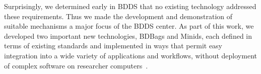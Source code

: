 \documentclass[11pt]{article}
\begin{document}

Surprisingly, we determined early in BDDS that no existing technology addressed these requirements.
Thus we made the development and demonstration of suitable mechanisms a major focus of the BDDS center.
As part of this work, we developed two important new technologies, BDBags and Minids, each
defined in terms of existing standards and
implemented in ways that permit easy integration into a wide variety of
applications and workflows, without deployment of complex software on researcher computers~\cite{chard16}.
\end{document}
